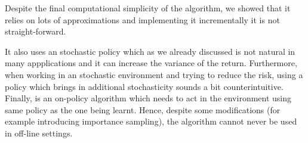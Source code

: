 Despite the final computational simplicity of the algorithm, we showed that it
relies on lots of approximations and implementing it incrementally it is not straight-forward.

It also uses an stochastic policy which as we already discussed  is not natural in many appplications and it can increase
the variance of the return. Furthermore, when working in an stochastic environment and trying to reduce the risk,
using a policy which brings in additional stochasticity sounds a bit counterintuitive.
Finally, is an on-policy algorithm which needs to act in the environment using same policy as the one being learnt.
Hence, despite some modifications (for example introducing importance sampling), the algorithm cannot never be used 
in off-line settings.
